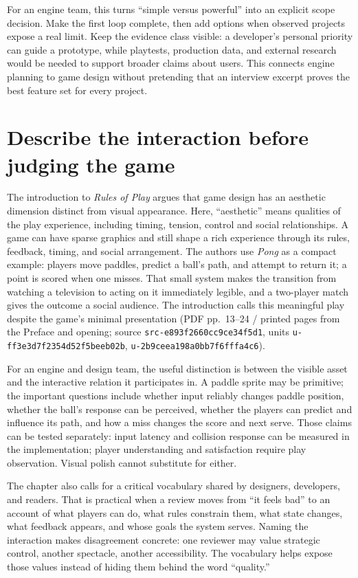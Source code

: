 For an engine team, this turns ``simple versus powerful'' into an explicit scope decision. Make the first loop complete, then add options when observed projects expose a real limit. Keep the evidence class visible: a developer's personal priority can guide a prototype, while playtests, production data, and external research would be needed to support broader claims about users. This connects engine planning to game design without pretending that an interview excerpt proves the best feature set for every project.

\section{Describe the interaction before judging the game}\label{06-engine-ii-ch047-describe-the-interaction-before-judging-the-game}

The introduction to \emph{Rules of Play} argues that game design has an aesthetic dimension distinct from visual appearance. Here, ``aesthetic'' means qualities of the play experience, including timing, tension, control and social relationships. A game can have sparse graphics and still shape a rich experience through its rules, feedback, timing, and social arrangement. The authors use \emph{Pong} as a compact example: players move paddles, predict a ball's path, and attempt to return it; a point is scored when one misses. That small system makes the transition from watching a television to acting on it immediately legible, and a two-player match gives the outcome a social audience. The introduction calls this meaningful play despite the game's minimal presentation (PDF pp.~13--24 / printed pages from the Preface and opening; source \texttt{src-e893f2660cc9ce34f5d1}, units \texttt{u-ff3e3d7f2354d52f5beeb02b}, \texttt{u-2b9ceea198a0bb7f6fffa4c6}).

For an engine and design team, the useful distinction is between the visible asset and the interactive relation it participates in. A paddle sprite may be primitive; the important questions include whether input reliably changes paddle position, whether the ball's response can be perceived, whether the players can predict and influence its path, and how a miss changes the score and next serve. Those claims can be tested separately: input latency and collision response can be measured in the implementation; player understanding and satisfaction require play observation. Visual polish cannot substitute for either.

The chapter also calls for a critical vocabulary shared by designers, developers, and readers. That is practical when a review moves from ``it feels bad'' to an account of what players can do, what rules constrain them, what state changes, what feedback appears, and whose goals the system serves. Naming the interaction makes disagreement concrete: one reviewer may value strategic control, another spectacle, another accessibility. The vocabulary helps expose those values instead of hiding them behind the word ``quality.''

